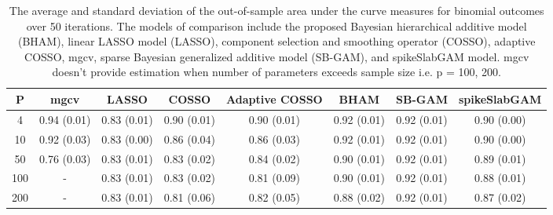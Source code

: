 \begin{table}[ht]
\centering
\begin{tabular}{cccccccc}
  \hline
P & mgcv & LASSO & COSSO & Adaptive COSSO & BHAM & SB-GAM & spikeSlabGAM \\ 
  \hline
  4 & 0.94 (0.01) & 0.83 (0.01) & 0.90 (0.01) & 0.90 (0.01) & 0.92 (0.01) & 0.92 (0.01) & 0.90 (0.00) \\ 
   10 & 0.92 (0.03) & 0.83 (0.00) & 0.86 (0.04) & 0.86 (0.03) & 0.92 (0.01) & 0.92 (0.01) & 0.90 (0.00) \\ 
   50 & 0.76 (0.03) & 0.83 (0.01) & 0.83 (0.02) & 0.84 (0.02) & 0.90 (0.01) & 0.92 (0.01) & 0.89 (0.01) \\ 
  100 & - & 0.83 (0.01) & 0.83 (0.02) & 0.81 (0.09) & 0.90 (0.01) & 0.92 (0.01) & 0.88 (0.01) \\ 
  200 & - & 0.83 (0.01) & 0.81 (0.06) & 0.82 (0.05) & 0.88 (0.02) & 0.92 (0.01) & 0.87 (0.02) \\ 
   \hline
\end{tabular}
\caption{The average and standard deviation of the out-of-sample area under the curve measures
    for binomial outcomes over 50 iterations. The models of comparison include the proposed Bayesian
    hierarchical additive model (BHAM), linear LASSO model (LASSO), component selection and smoothing
    operator (COSSO), adaptive COSSO, mgcv, sparse Bayesian generalized additive model (SB-GAM), and
    spikeSlabGAM model. mgcv doesn't provide
    estimation when number of parameters exceeds sample size i.e. p = 100, 200.} 
\label{tab:bin_auc}
\end{table}
